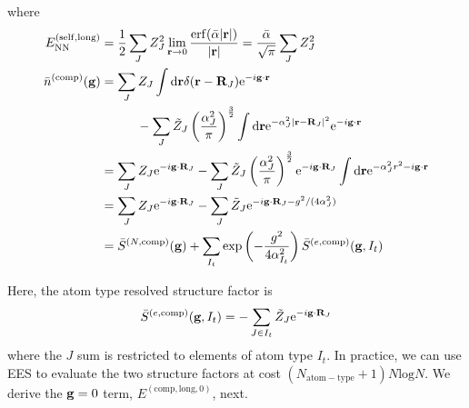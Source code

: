 \documentclass[paper=a4, fontsize=11pt]{article} %
\numberwithin{equation}{section} %
\numberwithin{figure}{section} %
\numberwithin{table}{section} %
\newcommand{\bg}{{\bf{g}}}
\newcommand{\br}{{\bf{r}}}
\newcommand{\bR}{{\bf{R}}}
\newcommand{\rexp}{{\mathrm{exp}}}
\newcommand{\rNN}{{\mathrm{NN}}}
\newcommand{\rself}{{\mathrm{self}}}
\newcommand{\re}{{\mathrm{e}}}
\newcommand{\rlong}{{\mathrm{long}}}
\newcommand{\rerf}{{\mathrm{erf}}}
\newcommand{\rd}{{\mathrm{d}}}
\newcommand{\rcomp}{{\mathrm{comp}}}
\newcommand{\rl}{{\mathrm{log}}}
\newcommand{\ibgR}{i\bg\cdot\bR}
\newcommand{\ibgr}{i\bg\cdot\br}
\newcommand{\al}{{\alpha}}
\newcommand{\bal}{{\bar{\alpha}}}
\begin{document}
where 
\begin{equation}
\begin{split}
E_{\rNN}^{(\rself,\rlong)}
&=\frac{1}{2}\sum_J Z_J^2 \lim_{\br \rightarrow 0}\frac{\rerf(\bar {\al}|\br|)}{|\br|} = \frac{\bal}{\sqrt{\pi}} \sum_J Z_J^2  \\
\bar n ^{(\rcomp)}(\bg)
&= \sum_J Z_J \int \rd \br \delta(\br - \bR_J) \re^{-\ibgr} \\
&\hspace{10mm} - \sum_J \tilde Z_J \left(\frac{\al_J^2}{\pi}\right)^{\frac{3}{2}} \int \rd \br \re^{-\al_J^2|\br-\bR_J|^2} \re^{-\ibgr}\\
&= \sum_J Z_J \re^{-\ibgR_J} - \sum_J \tilde Z_J \left(\frac{\al_J^2}{\pi}\right)^{\frac{3}{2}} \re^{-\ibgR_J} \int \rd \br \re^{-\al_J^2 r^2 - \ibgr}\\
&= \sum_J Z_J \re^{-\ibgR_J} -  \sum_J \tilde Z_J \re^{-\ibgR_J - g^2/(4\al_J^2)}\\
&= \bar S^{(N,\rcomp)}(\bg) + \sum_{I_t}\rexp\left(-\frac{g^2}{4\al_{I_t}^2}\right)\bar S^{(e,\rcomp)}(\bg,I_t)
\end{split}
\end{equation}


Here, the atom type resolved structure factor is 
\begin{equation}
\bar S^{(e,\rcomp)}(\bg,I_t) = -  \sum_{J \in I_t} \tilde Z_J \re^{-\ibgR_J }
\end{equation}
where the $J$ sum is restricted to elements of atom type $I_t$. In practice, we can use EES to evaluate the two structure factors at cost $(N_{\mathrm{atom-type}} + 1) N \rl N$. We derive the $\bg = 0$ term, $E^{(\rcomp,\rlong,0)}$, next.
\end{document}
